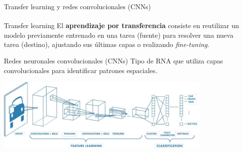 \documentclass{beamer}
\begin{document}
\begin{frame}{Transfer learning y redes convolucionales (CNNs)}
\framesubtitle{\insertsubsectionhead}
\begin{block}{Transfer learning}
El \textbf{aprendizaje por transferencia} consiste en reutilizar un modelo previamente entrenado en una tarea (fuente) para resolver una nueva tarea (destino), ajustando sus últimas capas o realizando \textit{fine-tuning}.
\end{block}


\begin{block}{Redes neuronales convolucionales (CNNs)}
    Tipo de RNA que utiliza capas convolucionales para identificar patrones espaciales.
\end{block}
\centering
\includegraphics[width=0.8\textwidth]{img/cnns.jpg}



\end{frame}



\end{document}
